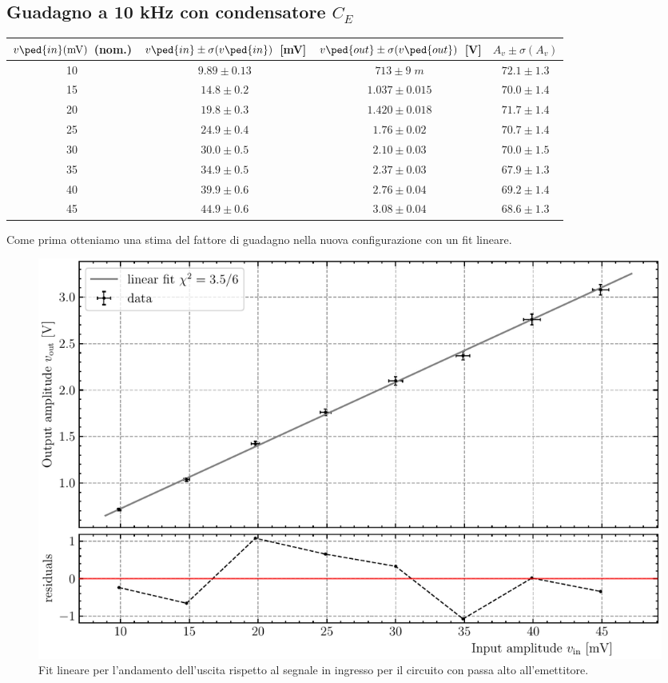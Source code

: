 \documentclass[10pt,a4paper]{article}
\begin{document}
\subsection{Guadagno a 10 kHz con condensatore $C_E$}
\begin{table}[htb]
\centering
\begin{tabular}{cccc}
\toprule
$v\ped{in}(\si{m\V})$ (nom.) & $v\ped{in} \pm \sigma(v\ped{in})$ [mV] & $v\ped{out} \pm \sigma(v\ped{out})$ [V] & $A_v \pm \sigma(A_v)$ \\
\midrule
\midrule
10 & $9.89 \pm 0.13$ & $713 \pm 9 \; \si{m}$ & $72.1 \pm 1.3$ \\
15 & $14.8 \pm 0.2$ & $1.037 \pm 0.015$ & $70.0 \pm 1.4$ \\
20 & $19.8 \pm 0.3$ & $1.420 \pm 0.018$ & $71.7 \pm 1.4$ \\
25 & $24.9 \pm 0.4$ & $1.76 \pm 0.02$ & $ 70.7 \pm 1.4$ \\
30 & $30.0 \pm 0.5$ & $2.10 \pm 0.03$ & $ 70.0 \pm 1.5$ \\
35 & $34.9 \pm 0.5$ & $2.37 \pm 0.03$ & $ 67.9 \pm 1.3$ \\
40 & $39.9 \pm 0.6$ & $2.76 \pm 0.04$ & $ 69.2 \pm 1.4$ \\
45 & $44.9 \pm 0.6$ & $3.08 \pm 0.04$ & $ 68.6 \pm 1.3$ \\
\bottomrule
\end{tabular}
\end{table}

Come prima otteniamo una stima del fattore di guadagno nella nuova
configurazione con un fit lineare.
\begin{figure}[htb]
\centering
\includegraphics[scale=0.6]{gainCE}
\caption{Fit lineare per l'andamento dell'uscita rispetto al segnale in
ingresso per il circuito con passa alto all'emettitore.
\label{fig: gainCEfit}}
\end{figure}
\end{document}
